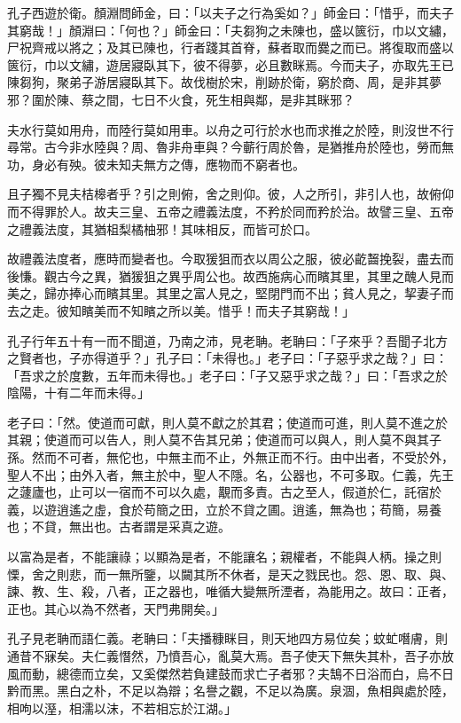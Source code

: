 \begin{pinyinscope}
孔子西遊於衛。顏淵問師金，曰：「以夫子之行為奚如？」師金曰：「惜乎，而夫子其窮哉！」顏淵曰：「何也？」師金曰：「夫芻狗之未陳也，盛以篋衍，巾以文繡，尸祝齊戒以將之；及其已陳也，行者踐其首脊，蘇者取而爨之而已。將復取而盛以篋衍，巾以文繡，遊居寢臥其下，彼不得夢，必且數眯焉。今而夫子，亦取先王已陳芻狗，聚弟子游居寢臥其下。故伐樹於宋，削跡於衛，窮於商、周，是非其夢邪？圍於陳、蔡之間，七日不火食，死生相與鄰，是非其眯邪？

夫水行莫如用舟，而陸行莫如用車。以舟之可行於水也而求推之於陸，則沒世不行尋常。古今非水陸與？周、魯非舟車與？今蘄行周於魯，是猶推舟於陸也，勞而無功，身必有殃。彼未知夫無方之傳，應物而不窮者也。

且子獨不見夫桔槔者乎？引之則俯，舍之則仰。彼，人之所引，非引人也，故俯仰而不得罪於人。故夫三皇、五帝之禮義法度，不矜於同而矜於治。故譬三皇、五帝之禮義法度，其猶柤梨橘柚邪！其味相反，而皆可於口。

故禮義法度者，應時而變者也。今取猨狙而衣以周公之服，彼必齕齧挽裂，盡去而後慊。觀古今之異，猶猨狙之異乎周公也。故西施病心而矉其里，其里之醜人見而美之，歸亦捧心而矉其里。其里之富人見之，堅閉門而不出；貧人見之，挈妻子而去之走。彼知矉美而不知矉之所以美。惜乎！而夫子其窮哉！」

孔子行年五十有一而不聞道，乃南之沛，見老聃。老聃曰：「子來乎？吾聞子北方之賢者也，子亦得道乎？」孔子曰：「未得也。」老子曰：「子惡乎求之哉？」曰：「吾求之於度數，五年而未得也。」老子曰：「子又惡乎求之哉？」曰：「吾求之於陰陽，十有二年而未得。」

老子曰：「然。使道而可獻，則人莫不獻之於其君；使道而可進，則人莫不進之於其親；使道而可以告人，則人莫不告其兄弟；使道而可以與人，則人莫不與其子孫。然而不可者，無佗也，中無主而不止，外無正而不行。由中出者，不受於外，聖人不出；由外入者，無主於中，聖人不隱。名，公器也，不可多取。仁義，先王之蘧廬也，止可以一宿而不可以久處，覯而多責。古之至人，假道於仁，託宿於義，以遊逍遙之虛，食於苟簡之田，立於不貸之圃。逍遙，無為也；苟簡，易養也；不貸，無出也。古者謂是采真之遊。

以富為是者，不能讓祿；以顯為是者，不能讓名；親權者，不能與人柄。操之則慄，舍之則悲，而一無所鑒，以闚其所不休者，是天之戮民也。怨、恩、取、與、諫、教、生、殺，八者，正之器也，唯循大變無所湮者，為能用之。故曰：正者，正也。其心以為不然者，天門弗開矣。」

孔子見老聃而語仁義。老聃曰：「夫播穅眯目，則天地四方易位矣；蚊虻噆膚，則通昔不寐矣。夫仁義憯然，乃憤吾心，亂莫大焉。吾子使天下無失其朴，吾子亦放風而動，總德而立矣，又奚傑然若負建鼓而求亡子者邪？夫鵠不日浴而白，烏不日黔而黑。黑白之朴，不足以為辯；名譽之觀，不足以為廣。泉涸，魚相與處於陸，相呴以溼，相濡以沫，不若相忘於江湖。」


\end{pinyinscope}
